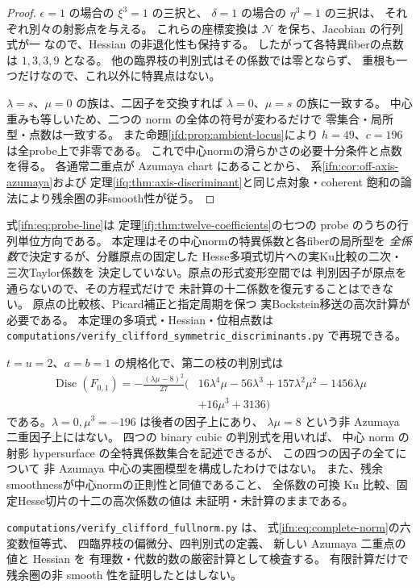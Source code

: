 \begin{proof}
$\epsilon=1$ の場合の $\xi^3=1$ の三択と、
$\delta=1$ の場合の $\eta^3=1$ の三択は、
それぞれ別々の射影点を与える。
これらの座標変換は $\mathcal N$ を保ち、Jacobian の行列式が一
なので、Hessian の非退化性も保持する。
したがって各特異fiberの点数は $1,3,3,9$ となる。
他の臨界枝の判別式はその係数では零とならず、
重根も一つだけなので、これ以外に特異点はない。

$\lambda=s$、$\mu=0$ の族は、二因子を交換すれば
$\lambda=0$、$\mu=s$ の族に一致する。
中心重みも等しいため、二つの norm の全体の符号が変わるだけで
零集合・局所型・点数は一致する。
また命題\ref{ifd:prop:ambient-locus}により
$h=49$、$c=196$ は全probe上で非零である。
これで中心normの滑らかさの必要十分条件と点数を得る。
各通常二重点が Azumaya chart にあることから、
系\ref{ifn:cor:off-axis-azumaya}および
定理\ref{ifq:thm:axis-discriminant}と同じ点対象・coherent
飽和の論法により残余圏の非smooth性が従う。
\end{proof}

\begin{remark}[一変数probeと高次比較係数]
\label{ifn:rem:probe-vs-jets}
式\eqref{ifn:eq:probe-line}は
定理\ref{ifj:thm:twelve-coefficients}の七つの
probe のうちの行列単位方向である。
本定理はその中心normの特異係数と各fiberの局所型を
\emph{全係数}で決定するが、分離原点の固定した
Hesse多項式切片への実Ku比較の二次・三次Taylor係数を
決定していない。原点の形式変形空間では
判別因子が原点を通らないので、その方程式だけで
未計算の十二係数を復元することはできない。
原点の比較核、Picard補正と指定周期を保つ
実Bockstein移送の高次計算が必要である。
本定理の多項式・Hessian・位相点数は
\texttt{computations/verify\_clifford\_symmetric\_discriminants.py}
で再現できる。
\end{remark}

\begin{remark}[判別因子の数と残る境界]
\label{ifn:rem:scope}
$t=u=2$、$a=b=1$ の規格化で、第二の枝の判別式は
\[
 \begin{split}
 \operatorname{Disc}(F_{0,1})=
 -\frac{(\lambda\mu-8)^2}{27}
 \bigl(&16\lambda^4\mu-56\lambda^3
 +157\lambda^2\mu^2-1456\lambda\mu\\
 &+16\mu^3+3136\bigr)
 \end{split}
\]
である。$\lambda=0,\mu^3=-196$ は後者の因子上にあり、
$\lambda\mu=8$ という非 Azumaya 二重因子上にはない。
四つの binary cubic の判別式を用いれば、
中心 norm の射影 hypersurface の全特異係数集合を記述できるが、
この四つの因子の全てについて
非 Azumaya 中心の実圏模型を構成したわけではない。
また、残余smoothnessが中心normの正則性と同値であること、
全係数の可換 Ku 比較、固定Hesse切片の十二の高次係数の値は
未証明・未計算のままである。

\texttt{computations/verify\_clifford\_fullnorm.py} は、
式\eqref{ifn:eq:complete-norm}の六変数恒等式、
四臨界枝の偏微分、四判別式の定義、
新しい Azumaya 二重点の値と Hessian を
有理数・代数的数の厳密計算として検査する。
有限計算だけで残余圏の非 smooth 性を証明したとはしない。
\end{remark}
